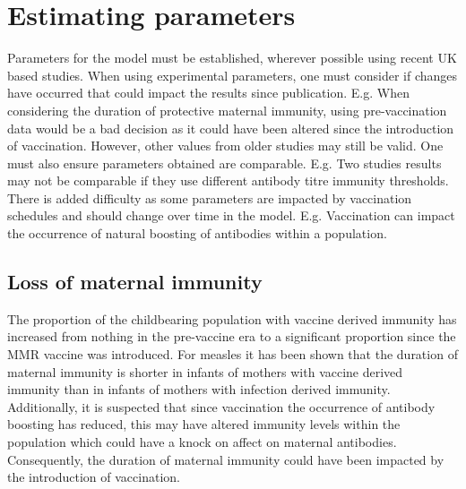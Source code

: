 \documentclass[a4paper,11pt] {scrartcl}
\begin{document}
\section{Estimating parameters}
\label{sec:estimateparameters}
Parameters for the model must be established, wherever possible using recent UK based studies. When using experimental parameters, one must consider if changes have occurred that could impact the results since publication. E.g. When considering the duration of protective maternal immunity, using pre-vaccination data would be a bad decision as it could have been altered since the introduction of vaccination. However, other values from older studies may still be valid. One must also ensure parameters obtained are comparable. E.g. Two studies results may not be comparable if they use different antibody titre immunity thresholds. There is added difficulty as some parameters are impacted by vaccination schedules and should change over time in the model. E.g. Vaccination can impact the occurrence of natural boosting of antibodies within a population\cite{glass2003antibody}.

\subsection{Loss of maternal immunity}
\label{subsec:estimateparameterslossofmaternal}
The proportion of the childbearing population with vaccine derived immunity has increased from nothing in the pre-vaccine era to a significant proportion since the MMR vaccine was introduced. For measles it has been shown that the duration of maternal immunity is shorter in infants of mothers with vaccine derived immunity than in infants of mothers with infection derived immunity. Additionally, it is suspected that since vaccination the occurrence of antibody boosting has reduced, this may have altered immunity levels within the population\cite{glass2003antibody} which could have a knock on affect on maternal antibodies. Consequently, the duration of maternal immunity could have been impacted by the introduction of vaccination.
\end{document}
